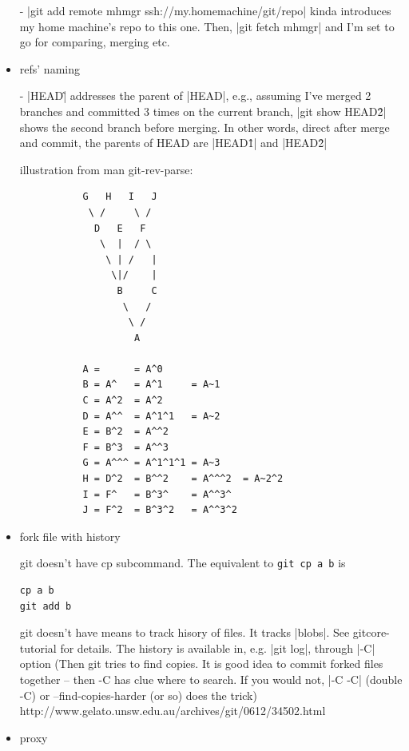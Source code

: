 \begin{itemize}
- |git add remote mhmgr ssh://my.homemachine/git/repo| kinda introduces
  my home machine's repo to this one. Then, |git fetch mhmgr| and I'm
  set to go for comparing, merging etc.

\item{refs' naming}

- |HEAD\^| addresses the parent of |HEAD|, e.g., assuming I've
  merged 2 branches and committed 3 times on the current branch, 
  |git show HEAD\^2| shows the second branch before merging. In
  other words, direct after merge and commit, the parents of HEAD are
  |HEAD\^1|  and |HEAD\^2|  
   
   illustration from man git-rev-parse:
   
   \begin{code} \begin{verbatim}
           G   H   I   J
            \ /     \ /
             D   E   F
              \  |  / \
               \ | /   |
                \|/    |
                 B     C
                  \   /
                   \ /
                    A

           A =      = A^0
           B = A^   = A^1     = A~1
           C = A^2  = A^2
           D = A^^  = A^1^1   = A~2
           E = B^2  = A^^2
           F = B^3  = A^^3
           G = A^^^ = A^1^1^1 = A~3
           H = D^2  = B^^2    = A^^^2  = A~2^2
           I = F^   = B^3^    = A^^3^
           J = F^2  = B^3^2   = A^^3^2

\end{verbatim} \end{code}

\item{fork file with history}

git doesn't have cp subcommand. The equivalent to \verb+git cp a b+ is 
\begin{code}\begin{verbatim}
cp a b
git add b
\end{verbatim} \end{code}

git doesn't have means to track hisory of files. It tracks |blobs|.
See gitcore-tutorial for details. The history is available in, e.g.
%
|git log|, through |-C| option (Then git tries to find copies.
It is good idea to commit forked files together -- then -C has clue
where to search. If you would not, |-C -C| (double -C) or
--find-copies-harder (or so) does the trick)
http://www.gelato.unsw.edu.au/archives/git/0612/34502.html

\item{proxy}


\end{itemize}
